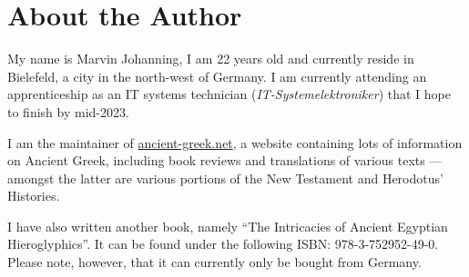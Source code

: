 \chapter*{About the Author}

My name is Marvin Johanning, I am 22 years old and currently reside in Bielefeld, a city in the north-west of Germany. I am currently attending an apprenticeship as an IT systems technician (\textit{IT-Systemelektroniker}) that I hope to finish by mid-2023. 

I am the maintainer of \url{ancient-greek.net}, a website containing lots of information on Ancient Greek, including book reviews and translations of various texts — amongst the latter are various portions of the New Testament and Herodotus’ Histories. 

I have also written another book, namely “The Intricacies of Ancient Egyptian Hieroglyphics”. It can be found under the following ISBN: 978-3-752952-49-0. Please note, however, that it can currently only be bought from Germany. 